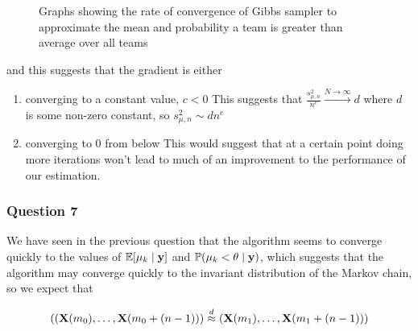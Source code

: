 \documentclass[11pt]{article} %
\let\originalleft\left
\let\originalright\right
\renewcommand{\left}{\mathopen{}\mathclose\bgroup\originalleft}
\renewcommand{\right}{\aftergroup\egroup\originalright}
\begin{document}
\begin{figure}[h]
\begin{subfigure}{0.48\textwidth}
	\end{subfigure}	
	\caption{Graphs showing the rate of convergence of Gibbs sampler to approximate the mean and probability a team is greater than average over all teams}
	\label{fig:log_sample_vars}
\end{figure} and this suggests that the gradient is either
\begin{enumerate}
	\item converging to a constant value, $c < 0$
	\subitem This suggests that $\frac{s^2_{\mu, n}}{n^c} \xrightarrow{N \to \infty} d$ where $d$ is some non-zero constant, so $s^2_{\mu, n} \sim d n^c $
	\item converging to $0$ from below
	\subitem This would suggest that at a certain point doing more iterations won't lead to much of an improvement to the performance of our estimation.
\end{enumerate}

\subsubsection*{Question 7}

We have seen in the previous question that the algorithm seems to converge quickly to the values of $\mathbb{E}\left[\mu_k\mid \mathbf{y}\right]$ and $\mathbb{P}\left(\mu_k < \theta \mid \mathbf{y}\right)$, which suggests that the algorithm may converge quickly to the invariant distribution of the Markov chain, so we expect that

\begin{equation*}
	\left((\mathbf{X}\left(m_0\right), \ldots, \mathbf{X}\left(m_0+\left(n-1\right)\right)\right) \overset{d}{\approx} \left(\mathbf{X}\left(m_1\right), \ldots, \mathbf{X}\left(m_1+\left(n-1\right)\right)\right)
\end{equation*}
\end{document}
